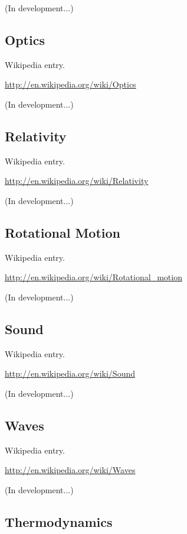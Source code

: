 \documentclass[12pt,oneside]{book}
\begin{document}
(In development...)

\subsection[Optics]{Optics}

Wikipedia entry.

\href{http://en.wikipedia.org/wiki/Optics}{http://en.wikipedia.org/wiki/Optics}

(In development...)

\subsection[Relativity]{Relativity}

Wikipedia entry.

\href{http://en.wikipedia.org/wiki/Relativity}{http://en.wikipedia.org/wiki/Relativity}

(In development...)

\subsection[Rotational Motion]{Rotational Motion}

Wikipedia entry.

\href{http://en.wikipedia.org/wiki/Rotational_motion}{http://en.wikipedia.org/wiki/Rotational\_motion}

(In development...)

\subsection[Sound]{Sound}

Wikipedia entry.

\href{http://en.wikipedia.org/wiki/Sound}{http://en.wikipedia.org/wiki/Sound}

(In development...)

\subsection[Waves]{Waves}

Wikipedia entry.

\href{http://en.wikipedia.org/wiki/Waves}{http://en.wikipedia.org/wiki/Waves}

(In development...)

\subsection[Thermodynamics]{Thermodynamics}
\end{document}
